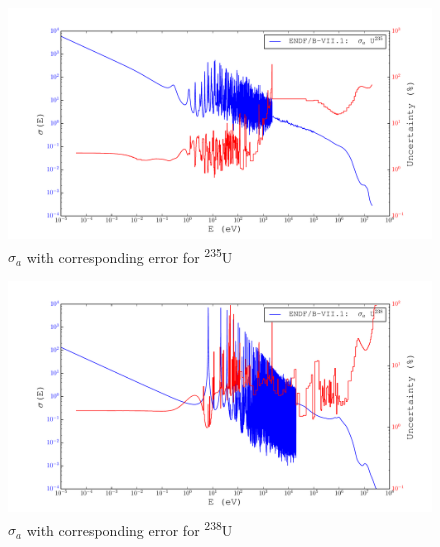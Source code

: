 \documentclass[11pt,notitlepage]{article}
\newcommand{\tss}{\textsuperscript}
\begin{document}
\begin{todolist}
  \begin{figure}[H]
    \begin{center}
      \includegraphics[width=0.9\columnwidth]{../Weighting/X_Sections/XwVar_U_235_92_a.pdf}
      \vspace{-5mm}
      \caption{$\sigma_a$ with corresponding error for \tss{235}U}
      \label{fig:XU235}
    \end{center}
  \end{figure}

  \begin{figure}[H]
    \begin{center}
      \includegraphics[width=0.9\columnwidth]{../Weighting/X_Sections/XwVar_U_238_92_a.pdf}
      \vspace{-5mm}
      \caption{$\sigma_a$ with corresponding error for \tss{238}U}
      \label{fig:XU238}
    \end{center}
  \end{figure}


\end{todolist}
\end{document}
